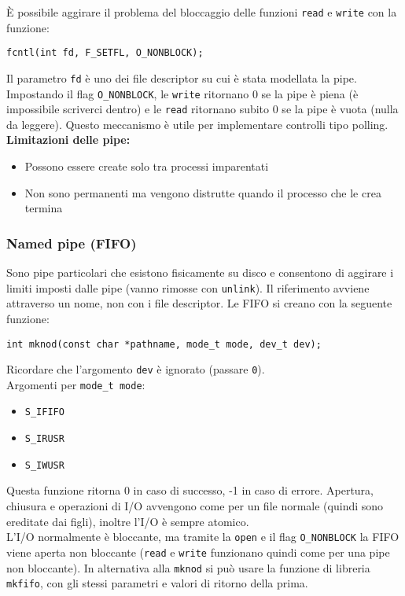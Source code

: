\documentclass[a4paper]{article}
\begin{document}
È possibile aggirare il problema del bloccaggio delle funzioni \verb|read| e \verb|write| con la funzione:
\begin{verbatim}
fcntl(int fd, F_SETFL, O_NONBLOCK);
\end{verbatim}
Il parametro \verb|fd| è uno dei file descriptor su cui è stata modellata la pipe.
Impostando il flag \verb|O_NONBLOCK|, le \verb|write| ritornano 0 se la pipe è piena (è impossibile scriverci dentro) e le \verb|read| ritornano subito 0 se la pipe è vuota (nulla da leggere).
Questo meccanismo è utile per implementare controlli tipo polling. \\

\textbf{Limitazioni delle pipe:} 
\begin{itemize}
\item Possono essere create solo tra processi imparentati
\item Non sono permanenti ma vengono distrutte quando il processo  che le crea termina
\end{itemize}

\subsubsection{Named pipe (FIFO)}
Sono pipe particolari che esistono fisicamente su disco e consentono di aggirare i limiti imposti dalle pipe (vanno rimosse con \verb|unlink|). Il riferimento avviene attraverso un nome, non con i file descriptor.
Le FIFO si creano con la seguente funzione:
\begin{verbatim}
int mknod(const char *pathname, mode_t mode, dev_t dev); 
\end{verbatim}
Ricordare che l'argomento \verb|dev| è ignorato (passare \verb|0|). \\
Argomenti per \verb|mode_t mode|:
\begin{itemize}
\item \verb|S_IFIFO|
\item \verb|S_IRUSR| 
\item \verb|S_IWUSR|
\end{itemize}
Questa funzione ritorna 0 in caso di successo, -1 in caso di errore.
Apertura, chiusura e operazioni di I/O avvengono come per un file normale (quindi sono ereditate dai figli), inoltre l'I/O è sempre atomico. \\
L'I/O normalmente è bloccante, ma tramite la \verb|open| e il flag \verb|O_NONBLOCK| la FIFO viene aperta non bloccante (\verb|read| e \verb|write| funzionano quindi come per una pipe non bloccante).
In alternativa alla \verb|mknod| si può usare la funzione di libreria \verb|mkfifo|, con gli stessi parametri e valori di ritorno della prima.
\end{document}
